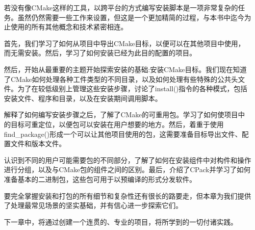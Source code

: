 若没有像CMake这样的工具，以跨平台的方式编写安装脚本是一项非常复杂的任务。虽然仍然需要一些工作来设置，但这是一个更加精简的过程，与本书中迄今为止使用的所有其他概念和技术紧密相连。

首先，我们学习了如何从项目中导出CMake目标，以便可以在其他项目中使用，而无需安装。然后，学习了如何安装已经为此目的配置的项目。

然后，开始从最重要的主题开始探索安装的基础:安装CMake目标。我们现在知道了CMake如何处理各种工件类型的不同目录，以及如何处理有些特殊的公共头文件。为了在较低级别上管理这些安装步骤，讨论了install()指令的各种模式，包括安装文件、程序和目录，以及在安装期间调用脚本。

解释了如何编写安装步骤之后，了解了CMake的可重用包。学习了如何使项目中的目标可重定位，以便包可以安装在用户想要的地方。然后，着重于使用find\_package()形成一个可以让其他项目使用的包，这需要准备目标导出文件、配置文件和版本文件。

认识到不同的用户可能需要包的不同部分，了解了如何在安装组件中对构件和操作进行分组，以及与CMake包的组件之间的区别。最后，介绍了CPack并学习了如何准备基本的二进制包，这些包可用于以预编译的形式分发软件。

要完全掌握安装和打包的所有细节和复杂性还有很长的路要走，但本章为我们提供了处理最常见场景的坚实基础，并有信心进一步探索它们。

下一章中，将通过创建一个连贯的、专业的项目，将所学到的一切付诸实践。








